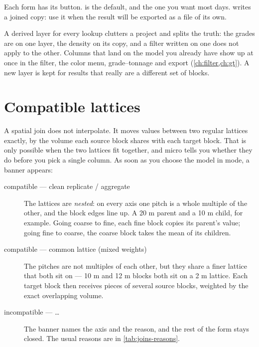 Each form has its button.  is the default, and the one you want most days.  writes a joined copy: use it when the result will be exported as a file of its own.

\begin{why}
A derived layer for every lookup clutters a project and splits the truth: the grades are on one layer, the density on its copy, and a filter written on one does not apply to the other. Columns that land on the model you already have show up at once in the filter, the color menu, grade–tonnage and export (\cref{ch:filter,ch:gt}). A new layer is kept for results that really are a different set of blocks.
\end{why}

\section{Compatible lattices}\label{sec:joins-compat}

A spatial join does not interpolate. It moves values between two regular lattices exactly, by the volume each source block shares with each target block. That is only possible when the two lattices fit together, and micro tells you whether they do before you pick a single column. As soon as you choose the  model in  mode, a banner appears:

\begin{description}
\item[compatible — clean replicate / aggregate] The lattices are \emph{nested}: on every axis one pitch is a whole multiple of the other, and the block edges line up. A 20 m parent and a 10 m child, for example. Going coarse to fine, each fine block copies its parent's value; going fine to coarse, the coarse block takes the mean of its children.
\item[compatible — common lattice (mixed weights)] The pitches are not multiples of each other, but they share a finer lattice that both sit on — 10 m and 12 m blocks both sit on a 2 m lattice. Each target block then receives pieces of several source blocks, weighted by the exact overlapping volume.
\item[incompatible — …] The banner names the axis and the reason, and the rest of the form stays closed. The usual reasons are in \cref{tab:joins-reasons}.
\end{description}


